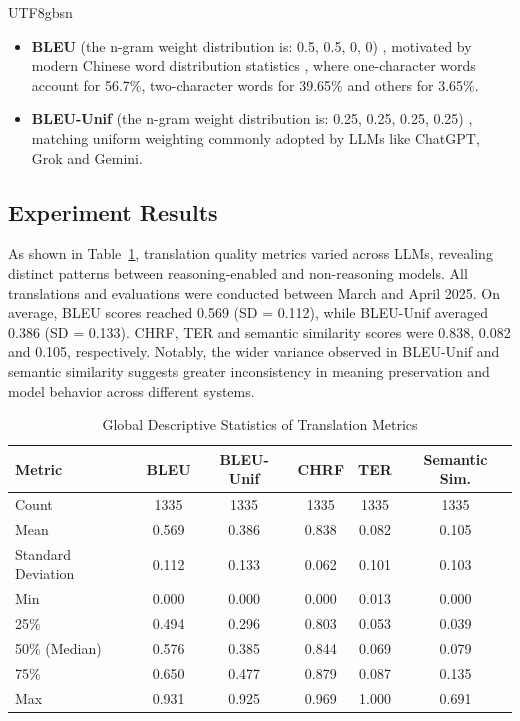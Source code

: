 \documentclass[conference]{IEEEtran}
\begin{document}
\begin{CJK}{UTF8}{gbsn}
\begin{itemize}
  \item \textbf{BLEU} (the n-gram weight distribution is: 0.5, 0.5, 0, 0) ,  motivated by modern Chinese word distribution statistics \citep{liu1986chinese}, where one-character words account for 56.7\%, two-character words for 39.65\% and others for 3.65\%.
  \item \textbf{BLEU-Unif} (the n-gram weight distribution is: 0.25, 0.25, 0.25, 0.25) ,  matching uniform weighting commonly adopted by LLMs like ChatGPT, Grok and Gemini.
\end{itemize}

\subsection{Experiment Results}
As shown in Table~\ref{tab:four_metrics I}, translation quality metrics varied across LLMs, revealing distinct patterns between reasoning-enabled and non-reasoning models. All translations and evaluations were conducted between March and April 2025. On average, BLEU scores reached 0.569 (SD = 0.112), while BLEU-Unif averaged 0.386 (SD = 0.133). CHRF, TER and semantic similarity scores were 0.838, 0.082 and 0.105, respectively. Notably, the wider variance observed in BLEU-Unif and semantic similarity suggests greater inconsistency in meaning preservation and model behavior across different systems.

\begin{table}[ht]
    \centering
    \small
    \caption{Global Descriptive Statistics of Translation Metrics}
    \label{tab:global_metrics}
    \begin{tabular}{lccccc}
        \toprule
        Metric & BLEU & BLEU-Unif & CHRF & TER & Semantic Sim. \\
        \midrule
        Count & 1335 & 1335 & 1335 & 1335 & 1335 \\
        Mean & 0.569 & 0.386 & 0.838 & 0.082 & 0.105 \\
        Standard Deviation & 0.112 & 0.133 & 0.062 & 0.101 & 0.103 \\
        Min & 0.000 & 0.000 & 0.000 & 0.013 & 0.000 \\
        25\% & 0.494 & 0.296 & 0.803 & 0.053 & 0.039 \\
        50\% (Median) & 0.576 & 0.385 & 0.844 & 0.069 & 0.079 \\
        75\% & 0.650 & 0.477 & 0.879 & 0.087 & 0.135 \\
        Max & 0.931 & 0.925 & 0.969 & 1.000 & 0.691 \\
        \bottomrule
    \end{tabular}
    \label{tab:four_metrics I}
\end{table}


\end{CJK}
\end{document}
